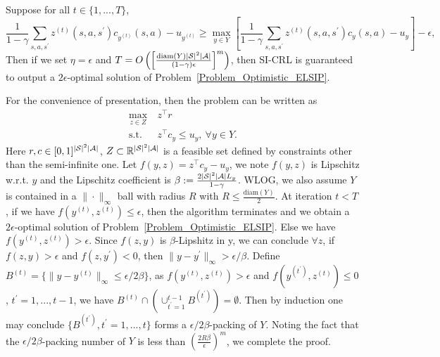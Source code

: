 \begin{lemma}\label{Lemma_Iteration_Comlexity_General}
    Suppose for all $t\in\{1,...,T\}$, 
    $$
    \frac{1}{1-\gamma}\sum_{s, a,s^\prime}z^{(t)}(s,a,s^\prime)c_{y^{(t)}}(s,a)- u_{y^{(t)}}\geq \max_{y\in Y}\left[\frac{1}{1-\gamma}\sum_{s, a,s^\prime}z^{(t)}(s,a,s^\prime)c_{y}(s,a)- u_{y}\right]-\epsilon,
    $$
    Then if we set $\eta=\epsilon$ and $T=O\left(\left[\frac{\mathrm{diam}(Y)|{\mathcal{S}}|^2|{\mathcal{A}}|}{(1-\gamma)\epsilon}\right]^m \right)$,
    then SI-CRL is guaranteed to output a $2\epsilon$-optimal solution of Problem~\ref{Problem_Optimistic_ELSIP}.
\end{lemma}
For the convenience of presentation, then the problem can be written as
$$
\begin{aligned}
    \max_{z\in Z}\ &z^\top r\\
    \text{s.t.}\ &z^\top c_y\leq u_y,\ \forall y\in Y.
\end{aligned}
$$
Here $r,c\in[0,1]^{|{\mathcal{S}}|^2|{\mathcal{A}}|}$, $Z\subset{\mathbb R}^{|{\mathcal{S}}|^2|{\mathcal{A}}|}$ is a feasible set defined by constraints other than the semi-infinite one.
Let $f(y,z)=z^\top c_y-u_y$, we note $f(y,z)$ is Lipschitz w.r.t. $y$ and the Lipschitz coefficient is $\beta:=\frac{2|{\mathcal{S}}|^2|{\mathcal{A}}|L_y}{1-\gamma}$.
WLOG, we also assume $Y$ is contained in a $\|\cdot\|_\infty$ ball with radius $R$ with $R\leq \frac{\mathrm{diam}(Y)}{2}$.
At iteration $t<T$, if we have $f(y^{(t)}, z^{(t)})\leq\epsilon$, then the algorithm terminates and we obtain a $2\epsilon$-optimal solution of Problem~\ref{Problem_Optimistic_ELSIP}.
Else we have $f(y^{(t)},z^{(t)})>\epsilon$.
Since $f(z,y)$ is $\beta$-Lipshitz in y, we can conclude $\forall z$, if $f(z,y)>\epsilon$ and $f(z,y^\prime)<0$, then $\|y-y^\prime\|_\infty>\epsilon/\beta$.
Define $B^{(t)}=\{\|y-y^{(t)}\|_\infty\leq \epsilon/2\beta\}$, as $f(y^{(t)},z^{(t)})>\epsilon$ and $f(y^{(t^\prime)},z^{(t)})\leq 0$, $t^\prime=1,...,t-1$, we have $B^{(t)}\cap\left(\cup_{t^\prime=1}^{t-1} B^{(t^\prime)}\right)=\emptyset$. 
Then by induction one may conclude $\{B^{(t^\prime)},t^\prime=1,...,t\}$ forms a $\epsilon/2\beta$-packing of $Y$.
Noting the fact that the $\epsilon/2\beta$-packing number of $Y$ is less than $\left(\frac{2R\beta}{\epsilon}\right)^m$, we complete the proof.

\endproof

